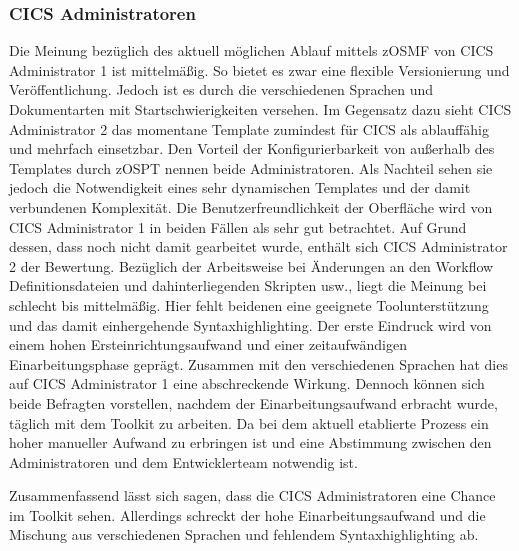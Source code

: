 \subsubsection{CICS Administratoren}
Die Meinung bezüglich des aktuell möglichen Ablauf mittels zOSMF von CICS Administrator 1 ist mittelmäßig.
So bietet es zwar eine flexible Versionierung und Veröffentlichung.
Jedoch ist es durch die verschiedenen Sprachen und Dokumentarten mit Startschwierigkeiten versehen.
Im Gegensatz dazu sieht CICS Administrator 2 das momentane Template zumindest für CICS als ablauffähig und mehrfach einsetzbar.
Den Vorteil der Konfigurierbarkeit von außerhalb des Templates durch zOSPT nennen beide Administratoren.
Als Nachteil sehen sie jedoch die Notwendigkeit eines sehr dynamischen Templates und der damit verbundenen Komplexität.
Die Benutzerfreundlichkeit der Oberfläche wird von CICS Administrator 1 in beiden Fällen als sehr gut betrachtet.
Auf Grund dessen, dass noch nicht damit gearbeitet wurde, enthält sich CICS Administrator 2 der Bewertung.
Bezüglich der Arbeitsweise bei Änderungen an den Workflow Definitionsdateien und dahinterliegenden Skripten usw., liegt die Meinung bei schlecht bis mittelmäßig.
Hier fehlt beidenen eine geeignete Toolunterstützung und das damit einhergehende Syntaxhighlighting.
Der erste Eindruck wird von einem hohen Ersteinrichtungsaufwand und einer zeitaufwändigen Einarbeitungsphase geprägt.
Zusammen mit den verschiedenen Sprachen hat dies auf CICS Administrator 1 eine abschreckende Wirkung.
Dennoch können sich beide Befragten vorstellen, nachdem der Einarbeitungsaufwand erbracht wurde, täglich mit dem Toolkit zu arbeiten.
Da bei dem aktuell etablierte Prozess ein hoher manueller Aufwand zu erbringen ist und eine Abstimmung zwischen den Administratoren und dem Entwicklerteam notwendig ist.

Zusammenfassend lässt sich sagen, dass die CICS Administratoren eine Chance im Toolkit sehen.
Allerdings schreckt der hohe Einarbeitungsaufwand und die Mischung aus verschiedenen Sprachen und fehlendem Syntaxhighlighting ab.

